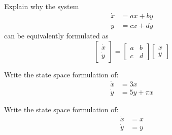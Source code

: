 

\begin{enumerate}

\qitem Explain why the system 
    \begin{align*}
        \dot{x} &= ax + by \\
        \dot{y} &= cx + dy
    \end{align*}
    can be equivalently formulated as
    \[
        \begin{bmatrix} \dot{x} \\ \dot{y} \end{bmatrix} = \begin{bmatrix} a & b \\ c & d \end{bmatrix} \begin{bmatrix} x \\ y \end{bmatrix}
    \]


\qitem Write the state space formulation of:
    \begin{align*}
        \dot{x} &= 3x \\
        \dot{y} &= 5y+\pi x
    \end{align*}

   \sol{
       \[
        \begin{bmatrix} \dot{x} \\ \dot{y} \end{bmatrix} = \begin{bmatrix} 3 & 0 \\ \pi & 5 \end{bmatrix} \begin{bmatrix} x \\ y \end{bmatrix}
    \]

   }


\qitem Write the state space formulation of:
    \begin{align*}
        \dot{x} &= x \\
        \dot{y} &= y
    \end{align*}

   \sol{
   \[
        \begin{bmatrix} \dot{x} \\ \dot{y} \end{bmatrix} = \begin{bmatrix} 1 & 0 \\ 0 & 1 \end{bmatrix} \begin{bmatrix} x \\ y \end{bmatrix}
    \]
   }





\end{enumerate}
